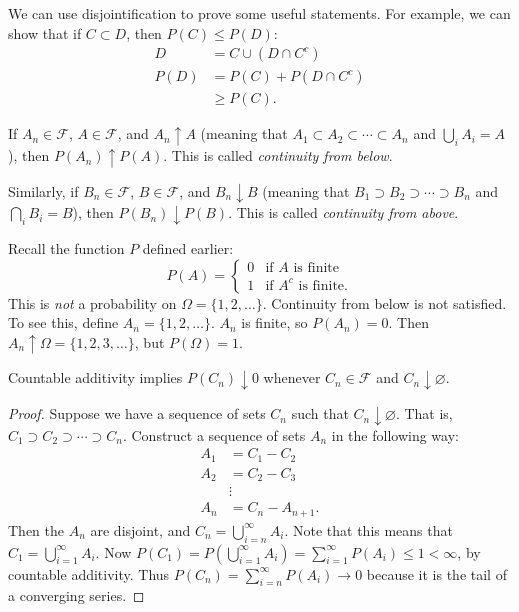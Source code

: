 \documentclass[11pt,fleqn]{book} %
\begin{document}
We can use disjointification to prove some useful statements. For example, we can show that if $C \subset D$, then $P(C) \leq P(D)$:
\begin{align*}
	D &= C \cup (D \cap C^c) \tag{by disjointification} \\
	P(D) &= P(C) + P(D \cap C^c) \\
	&\geq P(C) \tag{probability is non-negative}.
\end{align*}

\begin{definition} \label{def:continuity-from-below}
	If $A_n \in \mathcal{F}$, $A \in \mathcal{F}$, and $A_n \uparrow A$ (meaning that $A_1 \subset A_2 \subset \cdots \subset A_n$ and $\bigcup_i A_i = A$), then $P(A_n) \uparrow P(A)$. This is called \emph{continuity from below}.

	Similarly, if $B_n \in \mathcal{F}$, $B \in \mathcal{F}$, and $B_n \downarrow B$ (meaning that $B_1 \supset B_2 \supset \cdots \supset B_n$ and $\bigcap_i B_i = B$), then $P(B_n) \downarrow P(B)$. This is called \emph{continuity from above}.
\end{definition}

Recall the function $P$ defined earlier:
\[
	P(A) = \begin{cases}
		0 & \textrm{if } A \textrm{ is finite} \\
		1 & \textrm{if } A^c \textrm{ is finite}.
	\end{cases}
\]
This is \emph{not} a probability on $\Omega = \{1,2,\dots\}$. Continuity from below is not satisfied. To see this, define $A_n = \{1,2,\dots\}$. $A_n$ is finite, so $P(A_n)=0$. Then $A_n \uparrow \Omega = \{1,2,3,\dots\}$, but $P(\Omega)=1$.

\begin{theorem} \label{thm:1.2}
	Countable additivity implies $P(C_n) \downarrow 0$ whenever $C_n \in \mathcal{F}$ and $C_n \downarrow \varnothing$.
\end{theorem}

\begin{proof}
	Suppose we have a sequence of sets $C_n$ such that $C_n \downarrow \varnothing$. That is, $C_1 \supset C_2 \supset \cdots \supset C_n$. Construct a sequence of sets $A_n$ in the following way:
	\begin{align*}
		A_1 &= C_1 - C_2 \\
		A_2 &= C_2 - C_3 \\
		&\vdots \\
		A_n &= C_n - A_{n+1}.
	\end{align*}
	Then the $A_n$ are disjoint, and $C_n = \bigcup_{i=n}^\infty A_i$. Note that this means that $C_1 = \bigcup_{i=1}^\infty A_i$. Now $P(C_1) = P \left( \bigcup_{i=1}^\infty A_i \right) = \sum_{i=1}^\infty P(A_i) \leq 1 < \infty$, by countable additivity. Thus $P(C_n) = \sum_{i=n}^\infty P(A_i) \rightarrow 0$ because it is the tail of a converging series.
\end{proof}
\end{document}

